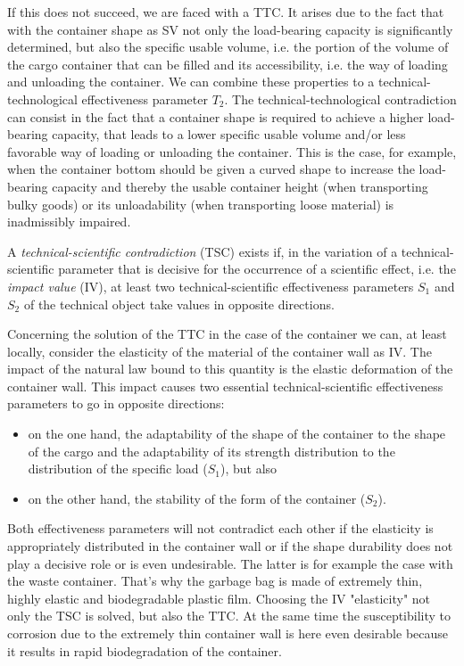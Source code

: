 \documentclass[11pt,a4paper]{article}
\begin{document}
If this does not succeed, we are faced with a TTC.  It arises due to the fact
that with the container shape as SV not only the load-bearing capacity is
significantly determined, but also the specific usable volume, i.e.  the
portion of the volume of the cargo container that can be filled and its
accessibility, i.e. the way of loading and unloading the container. We can
combine these properties to a technical-technological effectiveness parameter
$T_2$. The technical-technological contradiction can consist in the fact that
a container shape is required to achieve a higher load-bearing capacity, that
leads to a lower specific usable volume and/or less favorable way of loading
or unloading the container. This is the case, for example, when the container
bottom should be given a curved shape to increase the load-bearing capacity
and thereby the usable container height (when transporting bulky goods) or its
unloadability (when transporting loose material) is inadmissibly impaired.

A \emph{technical-scientific contradiction} (TSC) exists if, in the variation
of a technical-scientific parameter that is decisive for the occurrence of a
scientific effect, i.e. the \emph{impact value} (IV), at least two
technical-scientific effectiveness parameters $S_1$ and $S_2$ of the technical
object take values in opposite directions.

Concerning the solution of the TTC in the case of the container we can, at
least locally, consider the elasticity of the material of the container wall
as IV. The impact of the natural law bound to this quantity is the elastic
deformation of the container wall. This impact causes two essential
technical-scientific effectiveness parameters to go in opposite directions:
\begin{itemize}
\item on the one hand, the adaptability of the shape of the container to the
  shape of the cargo and the adaptability of its strength distribution to
  the distribution of the specific load ($S_1$), but also
\item on the other hand, the stability of the form of the container ($S_2$).
\end{itemize}

Both effectiveness parameters will not contradict each other if the elasticity
is appropriately distributed in the container wall or if the shape durability
does not play a decisive role or is even undesirable. The latter is for
example the case with the waste container. That's why the garbage bag is made
of extremely thin, highly elastic and biodegradable plastic film.  Choosing
the IV "elasticity" not only the TSC is solved, but also the TTC.  At the same
time the susceptibility to corrosion due to the extremely thin container wall
is here even desirable because it results in rapid biodegradation of the
container.
\end{document}

